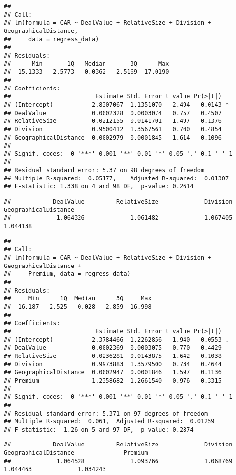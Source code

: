 \documentclass[]{article}
\begin{document}
\begin{verbatim}
## 
## Call:
## lm(formula = CAR ~ DealValue + RelativeSize + Division + GeographicalDistance, 
##     data = regress_data)
## 
## Residuals:
##      Min       1Q   Median       3Q      Max 
## -15.1333  -2.5773  -0.0362   2.5169  17.0190 
## 
## Coefficients:
##                        Estimate Std. Error t value Pr(>|t|)  
## (Intercept)           2.8307067  1.1351070   2.494   0.0143 *
## DealValue             0.0002328  0.0003074   0.757   0.4507  
## RelativeSize         -0.0212155  0.0141701  -1.497   0.1376  
## Division              0.9500412  1.3567561   0.700   0.4854  
## GeographicalDistance  0.0002979  0.0001845   1.614   0.1096  
## ---
## Signif. codes:  0 '***' 0.001 '**' 0.01 '*' 0.05 '.' 0.1 ' ' 1
## 
## Residual standard error: 5.37 on 98 degrees of freedom
## Multiple R-squared:  0.05177,    Adjusted R-squared:  0.01307 
## F-statistic: 1.338 on 4 and 98 DF,  p-value: 0.2614
\end{verbatim}

\begin{verbatim}
##            DealValue         RelativeSize             Division GeographicalDistance 
##             1.064326             1.061482             1.067405             1.044138
\end{verbatim}

\begin{verbatim}
## 
## Call:
## lm(formula = CAR ~ DealValue + RelativeSize + Division + GeographicalDistance + 
##     Premium, data = regress_data)
## 
## Residuals:
##     Min      1Q  Median      3Q     Max 
## -16.187  -2.525  -0.028   2.859  16.998 
## 
## Coefficients:
##                        Estimate Std. Error t value Pr(>|t|)  
## (Intercept)           2.3784466  1.2262856   1.940   0.0553 .
## DealValue             0.0002369  0.0003075   0.770   0.4429  
## RelativeSize         -0.0236281  0.0143875  -1.642   0.1038  
## Division              0.9973883  1.3579500   0.734   0.4644  
## GeographicalDistance  0.0002947  0.0001846   1.597   0.1136  
## Premium               1.2358682  1.2661540   0.976   0.3315  
## ---
## Signif. codes:  0 '***' 0.001 '**' 0.01 '*' 0.05 '.' 0.1 ' ' 1
## 
## Residual standard error: 5.371 on 97 degrees of freedom
## Multiple R-squared:  0.061,  Adjusted R-squared:  0.01259 
## F-statistic:  1.26 on 5 and 97 DF,  p-value: 0.2874
\end{verbatim}

\begin{verbatim}
##            DealValue         RelativeSize             Division GeographicalDistance              Premium 
##             1.064528             1.093766             1.068769             1.044463             1.034243
\end{verbatim}
\end{document}
